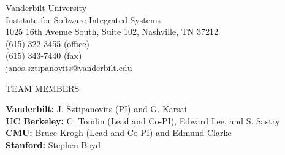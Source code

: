                \begin{center}
                 \begin{indentation}{0pt}{0pt}{0pt}
                 \end{indentation}
               \end{center} 

               \begin{center}
                 \begin{indentation}{0pt}{0pt}{0pt}
                 { Vanderbilt University \\
                   Institute for Software Integrated Systems \\
                   1025 16th Avenue South, Suite 102, Nashville, TN 37212 \\
                   (615) 322-3455 (office) \\
                   (615) 343-7440 (fax) \\
                   \underline{janos.sztipanovits@vanderbilt.edu} }
                 \end{indentation}
               \end{center}              

               \begin{center}
                 \begin{indentation}{0pt}{0pt}{0pt}
                 \end{indentation}
               \end{center}               

                \begin{center}
                 \begin{indentation}{0pt}{0pt}{0pt}
                 {TEAM MEMBERS}
                 \end{indentation}
               \end{center}

               \begin{center}
                 \begin{indentation}{0pt}{0pt}{0pt}

                 \end{indentation}
               \end{center}

                \begin{center}
                 \begin{indentation}{0pt}{0pt}{0pt}
                { \textbf{Vanderbilt:} J. Sztipanovits (PI) and G. Karsai \\
                  \textbf{UC Berkeley:} C. Tomlin (Lead and Co-PI), Edward Lee, and S. Sastry \\
                  \textbf{CMU:} Bruce Krogh (Lead and Co-PI) and Edmund Clarke \\
                  \textbf{Stanford:} Stephen Boyd }
                 \end{indentation}
               \end{center}



